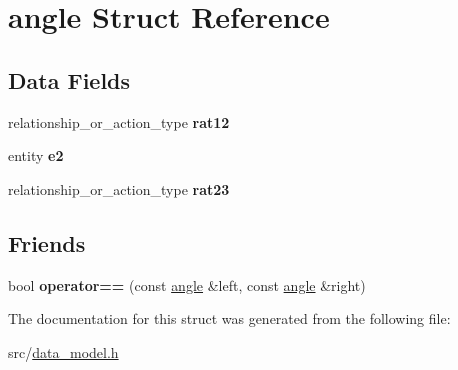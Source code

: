 \hypertarget{structangle}{}\section{angle Struct Reference}
\label{structangle}
\subsection*{Data Fields}
\begin{DoxyCompactItemize}
\item 
relationship\+\_\+or\+\_\+action\+\_\+type {\bfseries rat12}\hypertarget{structangle_ae2506f4585814e8db2472cc9665bc230}{}\label{structangle_ae2506f4585814e8db2472cc9665bc230}

\item 
entity {\bfseries e2}\hypertarget{structangle_a8be7ceadded85927d37e07a37f73e126}{}\label{structangle_a8be7ceadded85927d37e07a37f73e126}

\item 
relationship\+\_\+or\+\_\+action\+\_\+type {\bfseries rat23}\hypertarget{structangle_a718f64e8c5e13b0d0a3be99a034b87fe}{}\label{structangle_a718f64e8c5e13b0d0a3be99a034b87fe}

\end{DoxyCompactItemize}
\subsection*{Friends}
\begin{DoxyCompactItemize}
\item 
bool {\bfseries operator==} (const \hyperlink{structangle}{angle} \&left, const \hyperlink{structangle}{angle} \&right)\hypertarget{structangle_a08af3ce953cf2a9246fc60278c929a52}{}\label{structangle_a08af3ce953cf2a9246fc60278c929a52}

\end{DoxyCompactItemize}


The documentation for this struct was generated from the following file\+:\begin{DoxyCompactItemize}
\item 
src/\hyperlink{data__model_8h}{data\+\_\+model.\+h}\end{DoxyCompactItemize}
